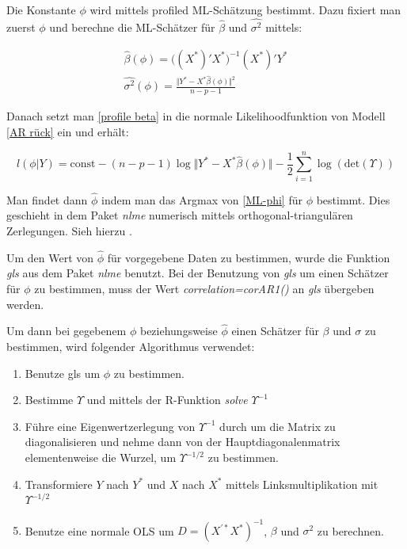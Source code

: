 \documentclass[12pt,a4paper]{article}
\theoremstyle{definition}
\theoremstyle{definition}
\theoremstyle{definition}
\theoremstyle{definition}
\begin{document}
Die Konstante $\phi$ wird mittels profiled ML-Schätzung bestimmt. Dazu fixiert man zuerst $\phi$ und berechne die ML-Schätzer für $\hat{\beta}$ und $\widehat{\sigma^2}$ mittels:

\begin{eqnarray}
\label{profile beta}
\hat{\beta}(\phi) =  \big( (X^*)' X^* \big)^{-1} (X^*)' Y^* \\
\widehat{\sigma^2}(\phi) = \frac{\Vert Y^* - X^* \hat{\beta}(\phi) \Vert^2}{n-p-1} \nonumber
\end{eqnarray}

Danach setzt man \eqref{profile beta} in die normale Likelihoodfunktion von Modell \eqref{AR rück} ein und erhält:

\begin{equation}\label{ML-phi}
l(\phi|Y) = \text{const} - (n-p-1) \log \Vert Y^* - X^* \hat{\beta}(\phi) \Vert - \frac{1}{2} \sum^n_{i=1} \log( \text{det} (\Upsilon) )
\end{equation}

Man findet dann $\hat{\phi}$ indem man das Argmax von \eqref{ML-phi} für $\phi$ bestimmt. Dies geschieht in dem Paket \textit{nlme} numerisch mittels orthogonal-triangulären Zerlegungen. Sieh hierzu \cite[68-75]{Pinheiro00}.

Um den Wert von $\hat{\phi}$ für vorgegebene Daten zu bestimmen, wurde die Funktion \textit{gls} aus dem Paket \textit{nlme} benutzt. Bei der Benutzung von \textit{gls} um einen Schätzer für $\phi$ zu bestimmen, muss der Wert \textit{correlation=corAR1()} an \textit{gls} übergeben werden.

Um dann bei gegebenem $\phi$ beziehungsweise $\hat{\phi}$ einen Schätzer für $\beta$ und $\sigma$ zu bestimmen, wird folgender Algorithmus verwendet:

\begin{enumerate}
\item Benutze gls um $\phi$ zu bestimmen.
\item Bestimme $\Upsilon$ und mittels der R-Funktion \textit{solve} $\Upsilon^{-1}$ 
\item Führe eine Eigenwertzerlegung von $\Upsilon^{-1}$ durch um die Matrix zu diagonalisieren und nehme dann von der Hauptdiagonalenmatrix elementenweise die Wurzel, um $\Upsilon^{-1/2}$ zu bestimmen.
\item Transformiere $Y$ nach $Y^{*}$ und $X$ nach $X^{*}$ mittels Linksmultiplikation mit $\Upsilon^{-1/2}$
\item Benutze eine normale OLS um $D=(X^{'*}X^{*})^{-1}$, $\beta$ und $\sigma^2$ zu berechnen.
\end{enumerate}
\end{document}

